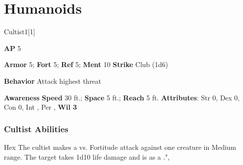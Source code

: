 \section{Humanoids}

\begin{monsection}{Cultist}{1}[1]
\vspace{-1em}\vspace{-1em}
\begin{spellcontent}
\begin{spelltargetinginfo}
{\textbf{AP} 5}

\pari \textbf{Armor} 5;
\textbf{Fort} 5;
\textbf{Ref} 5;
\textbf{Ment} 10
\pari \textbf{Strike} Club  (1d6)



\pari \textbf{Behavior} Attack highest threat
\end{spelltargetinginfo}
\end{spellcontent}

\begin{monsterfooter}
\pari \textbf{Awareness} 
\pari \textbf{Speed} 30 ft.;
\textbf{Space} 5 ft.;
\textbf{Reach} 5 ft.
\pari \textbf{Attributes}:
Str 0,
Dex 0,
Con 0,
Int ,
Per ,
\textbf{Wil 3}
\end{monsterfooter}
\end{monsection}


\subsubsection{Cultist Abilities}

\begin{ability}{Hex}
The cultist makes a  vs. Fortitude attack against one creature in Medium range.
\hit The target takes 1d10 life damage and is  as a .",
\end{ability}






